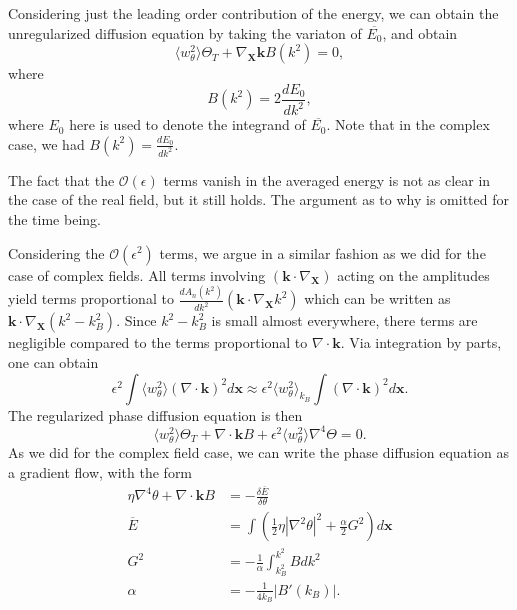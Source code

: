 \documentclass[12pt]{article}
\numberwithin{equation}{section}
\begin{document}
Considering just the leading order contribution of the energy, we can obtain the unregularized diffusion equation by taking the variaton of $\overline{E_0}$, and obtain
\begin{equation}
    \langle w_{\theta}^2 \rangle \Theta_T + \nabla_{\bm{X}}\bm{k}B(k^2)=0,
\end{equation}
where 
\begin{equation}
    B(k^2) = 2\frac{dE_0}{dk^2},
\end{equation}
where $E_0$ here is used to denote the integrand of $\overline{E_0}$. Note that in the complex case, we had $B(k^2)=\frac{dE_0}{dk^2}$.
\par The fact that the $\mathcal{O}(\epsilon)$ terms vanish in the averaged energy is not as clear in the case of the real field, but it still holds. The argument as to why is omitted for the time being. 
\par Considering the $\mathcal{O}(\epsilon^2)$ terms, we argue in a similar fashion as we did for the case of complex fields. All terms involving $(\bm{k}\cdot \nabla_{\bm{X}})$ acting on the amplitudes yield terms proportional to $\frac{dA_n(k^2)}{dk^2}(\bm{k}\cdot \nabla_{\bm{X}}k^2)$ which can be written as $\bm{k}\cdot \nabla_{\bm{X}}(k^2-k_B^2)$. Since $k^2-k_B^2$ is small almost everywhere, there terms are negligible compared to the terms proportional to $\nabla \cdot \bm{k}$. Via integration by parts, one can obtain
\begin{equation}
    \epsilon^2 \int \langle w_{\theta}^2 \rangle (\nabla \cdot \bm{k})^2 d\bm{x} \approx \epsilon^2 \langle w_{\theta}^2 \rangle_{k_B}\int (\nabla \cdot \bm{k})^2 d\bm{x}. 
\end{equation}
The regularized phase diffusion equation is then
\begin{equation}
    \langle w_{\theta}^2 \rangle \Theta_T + \nabla \cdot \bm{k}B + \epsilon^2 \langle w_{\theta}^2 \rangle\nabla^4 \Theta = 0.
\end{equation}
As we did for the complex field case, we can write the phase diffusion equation as a gradient flow, with the form
\begin{align}
    \eta \nabla^4 \theta + \nabla \cdot \bm{k}B &= -\frac{\delta \overline{E}}{\delta \theta}\\
    \overline{E} &= \int \left( \frac{1}{2}\eta|\nabla^2\theta|^2 + \frac{\alpha}{2}G^2 \right)d\bm{x}\\
    G^2 &= -\frac{1}{\alpha}\int_{k_B^2}^{k^2}Bdk^2\\
    \alpha &= -\frac{1}{4k_B}|B'(k_B)|.
\end{align}
\end{document}
